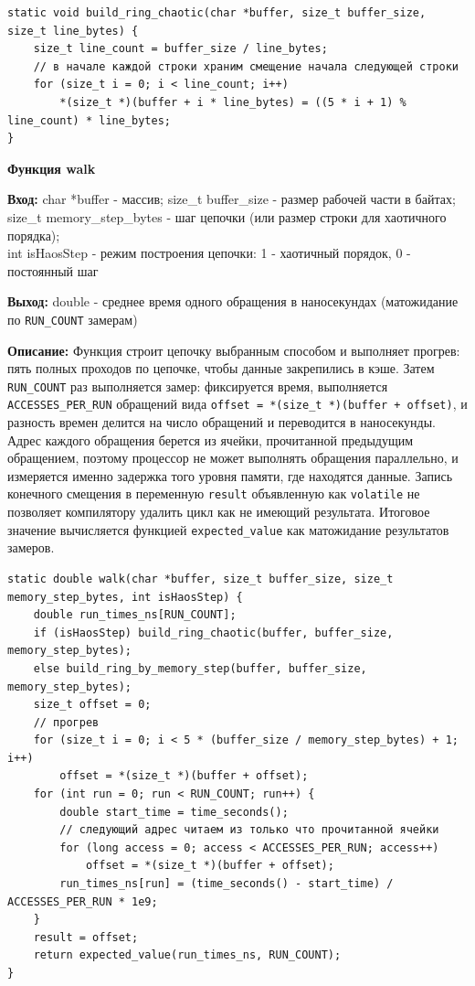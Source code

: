 \begin{lstlisting}[caption=build\_ring\_chaotic, label=lst:build-ring-chaotic]
static void build_ring_chaotic(char *buffer, size_t buffer_size, size_t line_bytes) {
    size_t line_count = buffer_size / line_bytes;
    // в начале каждой строки храним смещение начала следующей строки
    for (size_t i = 0; i < line_count; i++)
        *(size_t *)(buffer + i * line_bytes) = ((5 * i + 1) % line_count) * line_bytes;
}
\end{lstlisting}

\textbf{Функция walk } \par
\textbf{Вход:} char *buffer - массив; size\_t buffer\_size - размер рабочей части в байтах; size\_t memory\_step\_bytes - шаг цепочки (или размер строки для хаотичного порядка); \\ int isHaosStep - режим построения цепочки: 1 - хаотичный порядок, 0 - постоянный шаг \par
\textbf{Выход:} double - среднее время одного обращения в наносекундах (матожидание по \texttt{RUN\_COUNT} замерам) \par
\textbf{Описание:} Функция строит цепочку выбранным способом и выполняет прогрев: пять полных проходов по цепочке, чтобы данные закрепились в кэше. Затем \texttt{RUN\_COUNT} раз выполняется замер: фиксируется время, выполняется \texttt{ACCESSES\_PER\_RUN} обращений вида \texttt{offset = *(size\_t *)(buffer + offset)}, и разность времен делится на число обращений и переводится в наносекунды. Адрес каждого обращения берется из ячейки, прочитанной предыдущим обращением, поэтому процессор не может выполнять обращения параллельно, и измеряется именно задержка того уровня памяти, где находятся данные. Запись конечного смещения в переменную \texttt{result} объявленную как \texttt{volatile} не позволяет компилятору удалить цикл как не имеющий результата. Итоговое значение вычисляется функцией \texttt{expected\_value} как матожидание результатов замеров.\par
\vspace{10pt}

\newpage
\begin{lstlisting}[caption=walk, label=lst:walk]
static double walk(char *buffer, size_t buffer_size, size_t memory_step_bytes, int isHaosStep) {
    double run_times_ns[RUN_COUNT];
    if (isHaosStep) build_ring_chaotic(buffer, buffer_size, memory_step_bytes);
    else build_ring_by_memory_step(buffer, buffer_size, memory_step_bytes);
    size_t offset = 0;
    // прогрев
    for (size_t i = 0; i < 5 * (buffer_size / memory_step_bytes) + 1; i++)
        offset = *(size_t *)(buffer + offset);
    for (int run = 0; run < RUN_COUNT; run++) {
        double start_time = time_seconds();
        // следующий адрес читаем из только что прочитанной ячейки
        for (long access = 0; access < ACCESSES_PER_RUN; access++)
            offset = *(size_t *)(buffer + offset);
        run_times_ns[run] = (time_seconds() - start_time) / ACCESSES_PER_RUN * 1e9;
    }
    result = offset;
    return expected_value(run_times_ns, RUN_COUNT);
}
\end{lstlisting}

